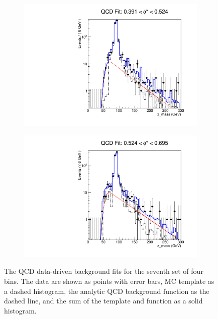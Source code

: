 \begin{figure}[!htbp]
\begin{subfigure}[b]{0.5\textwidth}
        \includegraphics[width=\linewidth]{figures/qcd_fits/qcd_fit_plot_for_27.pdf}
        \caption{}
        \label{fig:qcd_fit_27}
    \end{subfigure}%
    \begin{subfigure}[b]{0.5\textwidth}
        \includegraphics[width=\linewidth]{figures/qcd_fits/qcd_fit_plot_for_28.pdf}
        \caption{}
        \label{fig:qcd_fit_28}
    \end{subfigure}
    \caption{
       The QCD data-driven background fits for the seventh set of four \phistar
       bins. The data are shown as points with error bars, MC template as a
       dashed histogram, the analytic QCD background function as the dashed
       line, and the sum of the template and function as a solid histogram.
    }
    \label{fig:qcd_many_7}
\end{figure}

